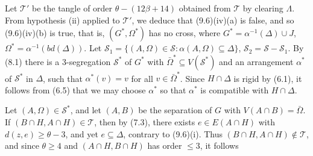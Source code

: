Let $\mathscr{T}'$ be the tangle of order $\theta - (12\beta + 14)$ obtained from $\mathscr{T}$ by clearing $\Lambda$. From hypothesis (ii) applied to $\mathscr{T}'$, we deduce that (9.6)(iv)(a) is false, and so (9.6)(iv)(b) is true, that is, $(G^*, \Omega^*)$ has no cross, where $G^* = \alpha^{-1}(\Delta) \cup J$, $\Omega^* = \alpha^{-1}(bd(\Delta))$. Let $\mathscr{S}_1 = \{(A, \Omega) \in \mathscr{S} : \alpha(A, \Omega) \subseteq \Delta\}$, $\mathscr{S}_2 = \mathscr{S} - \mathscr{S}_1$. By (8.1) there is a 3-segregation $\mathscr{S}^*$ of $G^*$ with $\bar{\Omega}^* \subseteq V(\mathscr{S}^*)$ and an arrangement $\alpha^*$ of $\mathscr{S}^*$ in $\Delta$, such that $\alpha^*(v) = v$ for all $v \in \bar{\Omega}^*$. Since $H \cap \Delta$ is rigid by (6.1), it follows from (6.5) that we may choose $\alpha^*$ so that $\alpha^*$ is compatible with $H \cap \Delta$.

Let $(A, \Omega) \in \mathscr{S}^*$, and let $(A, B)$ be the separation of $G$ with $V(A \cap B) = \bar{\Omega}$. If $(B \cap H, A \cap H) \in \mathscr{T}$, then by (7.3), there exists $e \in E(A \cap H)$ with $d(z, e) \ge \theta - 3$, and yet $e \subseteq \Delta$, contrary to (9.6)(i). Thus $(B \cap H, A \cap H) \notin \mathscr{T}$, and since $\theta \ge 4$ and $(A \cap H, B \cap H)$ has order $\le 3$, it follows
